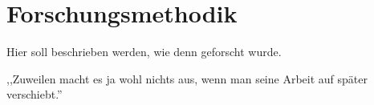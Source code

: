 \chapter{Forschungsmethodik}

Hier soll beschrieben werden, wie denn geforscht wurde.

,,Zuweilen macht es ja wohl nichts aus, wenn man seine Arbeit auf später verschiebt.''\cite{saint-exupery__2019}